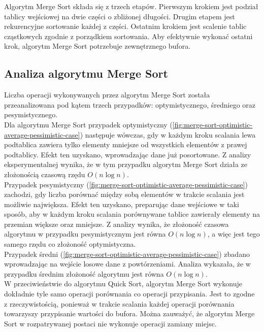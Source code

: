 Algorytm Merge Sort składa się z trzech etapów. Pierwszym krokiem jest podział tablicy wejściowej na dwie części o zbliżonej długości. Drugim etapem jest rekurencyjne sortowanie każdej z części. Ostatnim krokiem jest scalenie tablic cząstkowych zgodnie z porządkiem sortowania. Aby efektywnie wykonać ostatni krok, algorytm Merge Sort potrzebuje zewnętrznego bufora.\\

\subsection{Analiza algorytmu Merge Sort}
Liczba operacji wykonywanych przez algorytm Merge Sort została przeanalizowana pod kątem trzech przypadków:
optymistycznego, średniego oraz pesymistycznego.\\

Dla algorytmu Merge Sort przypadek optymistyczny (\ref{fig:merge-sort-optimistic-average-pessimistic-case}) następuje wówczas, gdy w każdym kroku scalania lewa podtablica zawiera tylko elementy mniejsze od wszystkich elementów z prawej podtablicy. Efekt ten uzyskano, wprowadzając dane już posortowane. Z analizy eksperymentalnej wynika, że w tym przypadku
algorytm Merge Sort działa ze złożonością czasową rzędu $O(n\log{}n)$.\\

Przypadek pesymistyczny (\ref{fig:merge-sort-optimistic-average-pessimistic-case}) zachodzi, gdy liczba porównać między 
sobą elementów w trakcie scalania jest możliwie największa. Efekt ten uzyskano, preparując dane wejściowe w taki sposób,
aby w każdym kroku scalania porównywane tablice zawierały elementy na przemian większe oraz mniejsze. Z analizy wynika, że złożoność czasowa algorytmu w przypadku pesymistycznym jest równa $O(n\log{}n)$, a więc jest tego samego rzędu co złożoność optymistyczna.\\

Przypadek średni (\ref{fig:merge-sort-optimistic-average-pessimistic-case}) zbadano wprowadzając na wejście losowe dane z powtórzeniami. Analiza wykazała, że w przypadku średnim złożoność algorytmu jest równa $O(n\log{}n)$.\\

W przeciwieństwie do algorytmu Quick Sort, algorytm Merge Sort wykonuje dokładnie tyle samo operacji porównania co operacji
przypisania. Jest to zgodne z rzeczywistością, ponieważ w trakcie scalania każdej operacji porównania towarzyszy przypisanie wartości do bufora. Można zauważyć, że algorytm Merge Sort w rozpatrywanej postaci nie wykonuje operacji zamiany miejsc.\\

